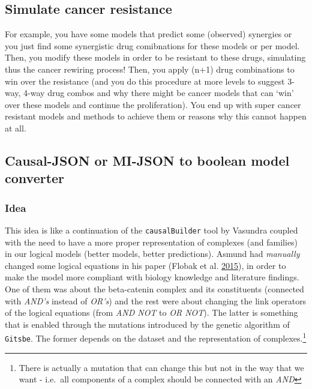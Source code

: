 \documentclass[
  12pt,
]{book}
\let\rmarkdownfootnote\footnote%
\def\footnote{\protect\rmarkdownfootnote}
\begin{document}
\hypertarget{simulate-cancer-resistance}{%
\subsection{Simulate cancer resistance}\label{simulate-cancer-resistance}}

For example, you have some models that predict some (observed) synergies or you
just find some synergistic drug comibnations for these models or per model.
Then, you modify these models in order to be resistant to these drugs, simulating
thus the cancer rewiring process! Then, you apply (n+1) drug combinations to
win over the resistance (and you do this procedure at more levels to suggest
3-way, 4-way drug combos and why there might be cancer models that can `win'
over these models and continue the proliferation). You end up with super cancer
resistant models and methods to achieve them or reasons why this cannot happen
at all.

\hypertarget{causal-json-or-mi-json-to-boolean-model-converter}{%
\subsection*{Causal-JSON or MI-JSON to boolean model converter}\label{causal-json-or-mi-json-to-boolean-model-converter}}

\hypertarget{idea-3}{%
\subsubsection*{Idea}\label{idea-3}}

This idea is like a continuation of the \texttt{causalBuilder} tool by Vasundra coupled with the need to have a more proper representation of complexes (and families) in our logical models (better models, better predictions).
Asmund had \emph{manually} changed some logical equations in his paper (Flobak et al. \protect\hyperlink{ref-Flobak2015}{2015}), in order to make the model more compliant with biology knowledge and literature findings.
One of them was about the beta-catenin complex and its constituents (connected with \emph{AND's} instead of \emph{OR's}) and the rest were about changing the link operators of the logical equations (from \emph{AND NOT} to \emph{OR NOT}).
The latter is something that is enabled through the mutations introduced by the genetic algorithm of \texttt{Gitsbe}.
The former depends on the dataset and the representation of complexes.\footnote{There is actually a mutation that can change this but not in the way that we want - i.e.~all components of a complex should be connected with an \emph{AND}}
\end{document}

